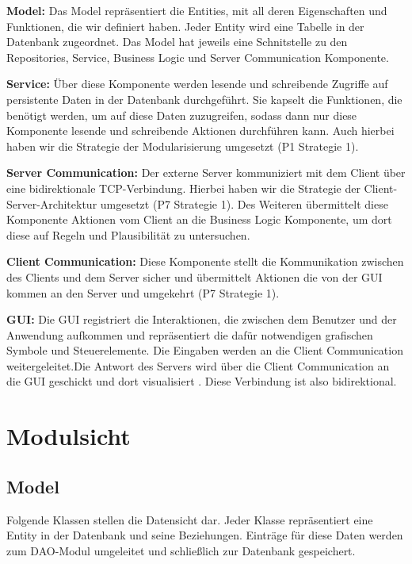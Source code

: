 \documentclass[fontsize=12pt,paper=a4,twoside]{scrartcl}
\begin{document}
\textbf{Model:}
Das Model repräsentiert die Entities, mit all deren Eigenschaften und Funktionen, die wir definiert haben. Jeder Entity wird eine Tabelle in der Datenbank zugeordnet. Das Model hat jeweils eine Schnitstelle zu den Repositories, Service, Business Logic und Server Communication Komponente.

\textbf{Service:} Über diese Komponente werden lesende und schreibende Zugriffe auf persistente Daten in der Datenbank durchgeführt. Sie kapselt die Funktionen, die benötigt werden, um auf diese Daten zuzugreifen, sodass dann nur diese Komponente lesende und schreibende Aktionen durchführen kann. Auch hierbei haben wir die Strategie der Modularisierung umgesetzt (P1 Strategie 1).

\textbf{Server Communication:} Der externe Server kommuniziert mit dem Client über eine bidirektionale TCP-Verbindung. Hierbei haben wir die Strategie der Client-Server-Architektur umgesetzt (P7 Strategie 1). Des Weiteren übermittelt diese Komponente Aktionen vom Client an die Business Logic Komponente, um dort diese auf Regeln und Plausibilität zu untersuchen.

\textbf{Client Communication:} Diese Komponente stellt die Kommunikation zwischen des Clients und dem Server sicher und übermittelt Aktionen die von der GUI kommen an den Server und umgekehrt (P7 Strategie 1).

\textbf{GUI:}
Die GUI registriert die Interaktionen, die zwischen dem Benutzer und der Anwendung aufkommen und repräsentiert die dafür notwendigen grafischen Symbole und
Steuerelemente. Die Eingaben werden an die Client Communication weitergeleitet.Die Antwort des Servers wird über die Client Communication an die GUI geschickt und dort visualisiert . Diese Verbindung ist also bidirektional.


\section{Modulsicht} \label{sec:modulsicht}
\subsection{Model}
Folgende Klassen stellen die Datensicht dar. Jeder Klasse repräsentiert eine Entity in der Datenbank und seine Beziehungen. Einträge für diese Daten werden zum DAO-Modul umgeleitet und schließlich zur Datenbank gespeichert.
\end{document}
